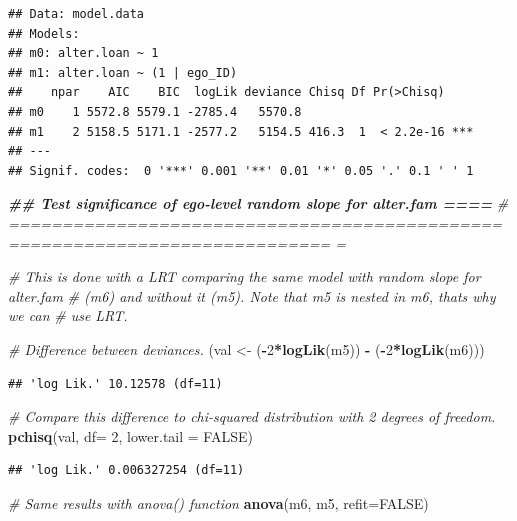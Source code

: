 \documentclass[
]{book}
\newenvironment{Shaded}{\begin{snugshade}}{\end{snugshade}}
\newcommand{\AttributeTok}[1]{\textcolor[rgb]{0.13,0.29,0.53}{#1}}
\newcommand{\CommentTok}[1]{\textcolor[rgb]{0.56,0.35,0.01}{\textit{#1}}}
\newcommand{\ConstantTok}[1]{\textcolor[rgb]{0.56,0.35,0.01}{#1}}
\newcommand{\DecValTok}[1]{\textcolor[rgb]{0.00,0.00,0.81}{#1}}
\newcommand{\DocumentationTok}[1]{\textcolor[rgb]{0.56,0.35,0.01}{\textbf{\textit{#1}}}}
\newcommand{\FunctionTok}[1]{\textcolor[rgb]{0.13,0.29,0.53}{\textbf{#1}}}
\newcommand{\NormalTok}[1]{#1}
\newcommand{\OtherTok}[1]{\textcolor[rgb]{0.56,0.35,0.01}{#1}}
\newcommand{\SpecialCharTok}[1]{\textcolor[rgb]{0.81,0.36,0.00}{\textbf{#1}}}
\begin{document}
\begin{verbatim}
## Data: model.data
## Models:
## m0: alter.loan ~ 1
## m1: alter.loan ~ (1 | ego_ID)
##    npar    AIC    BIC  logLik deviance Chisq Df Pr(>Chisq)    
## m0    1 5572.8 5579.1 -2785.4   5570.8                        
## m1    2 5158.5 5171.1 -2577.2   5154.5 416.3  1  < 2.2e-16 ***
## ---
## Signif. codes:  0 '***' 0.001 '**' 0.01 '*' 0.05 '.' 0.1 ' ' 1
\end{verbatim}

\begin{Shaded}
\begin{Highlighting}[]
\DocumentationTok{\#\# Test significance of ego{-}level random slope for alter.fam                ====}
\CommentTok{\# ============================================================================ =}

\CommentTok{\# This is done with a LRT comparing the same model with random slope for alter.fam}
\CommentTok{\# (m6) and without it (m5). Note that m5 is nested in m6, that\textquotesingle{}s why we can }
\CommentTok{\# use LRT.}

\CommentTok{\# Difference between deviances.}
\NormalTok{(val }\OtherTok{\textless{}{-}}\NormalTok{ (}\SpecialCharTok{{-}}\DecValTok{2}\SpecialCharTok{*}\FunctionTok{logLik}\NormalTok{(m5)) }\SpecialCharTok{{-}}\NormalTok{ (}\SpecialCharTok{{-}}\DecValTok{2}\SpecialCharTok{*}\FunctionTok{logLik}\NormalTok{(m6)))}
\end{Highlighting}
\end{Shaded}

\begin{verbatim}
## 'log Lik.' 10.12578 (df=11)
\end{verbatim}

\begin{Shaded}
\begin{Highlighting}[]
\CommentTok{\# Compare this difference to chi{-}squared distribution with 2 degrees of freedom.}
\FunctionTok{pchisq}\NormalTok{(val, }\AttributeTok{df=} \DecValTok{2}\NormalTok{, }\AttributeTok{lower.tail =} \ConstantTok{FALSE}\NormalTok{)}
\end{Highlighting}
\end{Shaded}

\begin{verbatim}
## 'log Lik.' 0.006327254 (df=11)
\end{verbatim}

\begin{Shaded}
\begin{Highlighting}[]
\CommentTok{\# Same results with anova() function}
\FunctionTok{anova}\NormalTok{(m6, m5, }\AttributeTok{refit=}\ConstantTok{FALSE}\NormalTok{)}
\end{Highlighting}
\end{Shaded}
\end{document}
